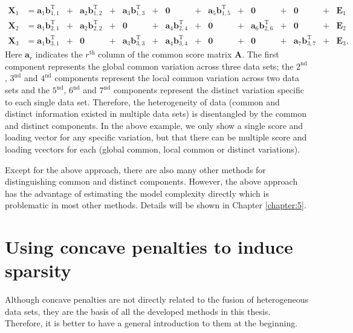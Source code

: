 \begin{equation*}
\begin{aligned}
   \mathbf{X}_1 & = \mathbf{a}_1\mathbf{b}_{1,1}^{\text{T}} &+& \mathbf{a}_2\mathbf{b}_{1,2}^{\text{T}} &+& \mathbf{a}_3\mathbf{b}_{1,3}^{\text{T}} &+& \mathbf{0}                     &+& \mathbf{a}_5\mathbf{b}_{1,5}^{\text{T}} &+& \mathbf{0}                     &+& \mathbf{0}  &+& \mathbf{E}_1                   \\
   \mathbf{X}_2 & = \mathbf{a}_1\mathbf{b}_{2,1}^{\text{T}} &+& \mathbf{a}_2\mathbf{b}_{2,2}^{\text{T}} &+& \mathbf{0}                     &+& \mathbf{a}_4\mathbf{b}_{2,4}^{\text{T}} &+& \mathbf{0}                     &+& \mathbf{a}_6\mathbf{b}_{2,6}^{\text{T}} &+& \mathbf{0}  &+& \mathbf{E}_2                   \\
   \mathbf{X}_3 & = \mathbf{a}_1\mathbf{b}_{3,1}^{\text{T}} &+& \mathbf{0}                     &+& \mathbf{a}_3\mathbf{b}_{3,3}^{\text{T}} &+& \mathbf{a}_4\mathbf{b}_{3,4}^{\text{T}} &+& \mathbf{0}                     &+& \mathbf{0}                     &+& \mathbf{a}_7\mathbf{b}_{3,7}^{\text{T}} &+& \mathbf{E}_3 .
\end{aligned}
\end{equation*}
Here $\mathbf{a}_r$ indicates the $r^{\text{th}}$ column of the common score matrix $\mathbf{A}$. The first component represents the global common variation across three data sets; the $2^{\text{nd}}$, $3^{\text{nd}}$ and $4^{\text{nd}}$ components represent the local common variation across two data sets and the $5^{\text{nd}}$, $6^{\text{nd}}$ and $7^{\text{nd}}$ components represent the distinct variation specific to each single data set. Therefore, the heterogeneity of data (common and distinct information existed in multiple data sets) is disentangled by the common and distinct components. In the above example, we only show a single score and loading vector for any specific variation, but that there can be multiple score and loading vcectors for each (global common, local common or distinct variations).

Except for the above approach, there are also many other methods for distinguishing common and distinct components. However, the above approach has the advantage of estimating the model complexity directly which is problematic in most other methods. Details will be shown in Chapter \ref{chapter:5}.

\section{Using concave penalties to induce sparsity}
Although concave penalties are not directly related to the fusion of heterogeneous data sets, they are the basis of all the developed methods in this thesis. Therefore, it is better to have a general introduction to them at the beginning.

